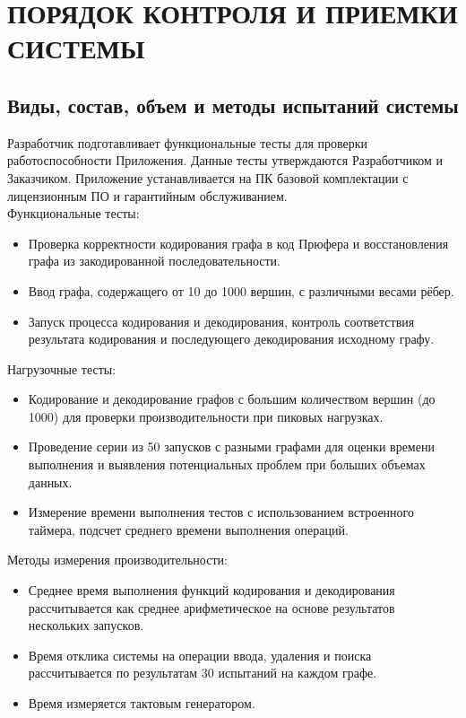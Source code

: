 \documentclass[12pt,a4paper]{article}
\begin{document}
\section{ПОРЯДОК КОНТРОЛЯ И ПРИЕМКИ СИСТЕМЫ}
\subsection{Виды, состав, объем и методы испытаний системы}\label{isp}
Разработчик подготавливает функциональные тесты для проверки работоспособности Приложения.
Данные тесты утверждаются Разработчиком и Заказчиком. \newline 
Приложение устанавливается на ПК базовой комплектации с лицензионным ПО и гарантийным обслуживанием. \\

\noindent Функциональные тесты:
\begin{itemize}
    \item Проверка корректности кодирования графа в код Прюфера и восстановления графа из 
    закодированной последовательности.
    \item Ввод графа, содержащего от 10 до 1000 вершин, с различными весами рёбер.
    \item Запуск процесса кодирования и декодирования, контроль соответствия результата кодирования
    и последующего декодирования исходному графу.
\end{itemize}

\noindent Нагрузочные тесты:
\begin{itemize}
    \item Кодирование и декодирование графов с большим количеством вершин (до 1000) для проверки 
    производительности при пиковых нагрузках.
    \item Проведение серии из 50 запусков с разными графами для оценки времени выполнения и выявления 
    потенциальных проблем при больших объемах данных.
    \item Измерение времени выполнения тестов с использованием встроенного таймера, подсчет среднего 
    времени выполнения операций.
\end{itemize}

\noindent Методы измерения производительности:
\begin{itemize}
    \item Среднее время выполнения функций кодирования и декодирования рассчитывается как среднее 
    арифметическое на основе результатов нескольких запусков.
    \item Время отклика системы на операции ввода, удаления и поиска рассчитывается по результатам 30 
    испытаний на каждом графе.
    \item Время измеряется тактовым генератором.
\end{itemize}
\end{document}
